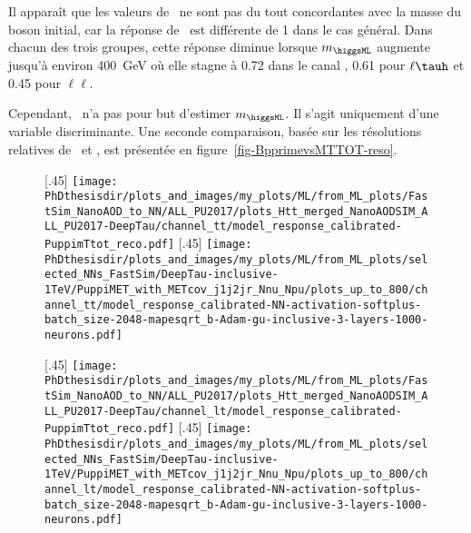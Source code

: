 Il apparaît que les valeurs de \mTtot\ ne sont pas du tout concordantes avec la masse du boson initial, car la réponse de \mTtot\ est différente de 1 dans le cas général.
Dans chacun des trois groupes,
cette réponse diminue lorsque $m_{\higgsML}$ augmente jusqu'à environ \SI{400}{\GeV} où elle stagne
à \num{0.72} dans le canal \tauh\tauh,
\num{0.61} pour $\ell\tauh$
et
\num{0.45} pour $\ell\ell$.
\par
Cependant, \mTtot\ n'a pas pour but d'estimer $m_{\higgsML}$.
Il s'agit uniquement d'une variable discriminante.
Une seconde comparaison, basée sur les résolutions relatives de \mTtot\ et \mml, est présentée en figure~\ref{fig-BpprimevsMTTOT-reso}.
\begin{figure}[p]
\centering

[.45\textwidth]
{\texttt{[image: \\PhDthesisdir/plots\_and\_images/my\_plots/ML/from\_ML\_plots/FastSim\_NanoAOD\_to\_NN/ALL\_PU2017/plots\_Htt\_merged\_NanoAODSIM\_ALL\_PU2017-DeepTau/channel\_tt/model\_response\_calibrated-PuppimTtot\_reco.pdf]}\vspace{-.5\baselineskip}}
\hfill
{}[.45\textwidth]
{\texttt{[image: \\PhDthesisdir/plots\_and\_images/my\_plots/ML/from\_ML\_plots/selected\_NNs\_FastSim/DeepTau-inclusive-1TeV/PuppiMET\_with\_METcov\_j1j2jr\_Nnu\_Npu/plots\_up\_to\_800/channel\_tt/model\_response\_calibrated-NN-activation-softplus-batch\_size-2048-mapesqrt\_b-Adam-gu-inclusive-3-layers-1000-neurons.pdf]}\vspace{-.5\baselineskip}}

[.45\textwidth]
{\texttt{[image: \\PhDthesisdir/plots\_and\_images/my\_plots/ML/from\_ML\_plots/FastSim\_NanoAOD\_to\_NN/ALL\_PU2017/plots\_Htt\_merged\_NanoAODSIM\_ALL\_PU2017-DeepTau/channel\_lt/model\_response\_calibrated-PuppimTtot\_reco.pdf]}\vspace{-.5\baselineskip}}
\hfill
{}[.45\textwidth]
{\texttt{[image: \\PhDthesisdir/plots\_and\_images/my\_plots/ML/from\_ML\_plots/selected\_NNs\_FastSim/DeepTau-inclusive-1TeV/PuppiMET\_with\_METcov\_j1j2jr\_Nnu\_Npu/plots\_up\_to\_800/channel\_lt/model\_response\_calibrated-NN-activation-softplus-batch\_size-2048-mapesqrt\_b-Adam-gu-inclusive-3-layers-1000-neurons.pdf]}\vspace{-.5\baselineskip}}


\end{figure}
